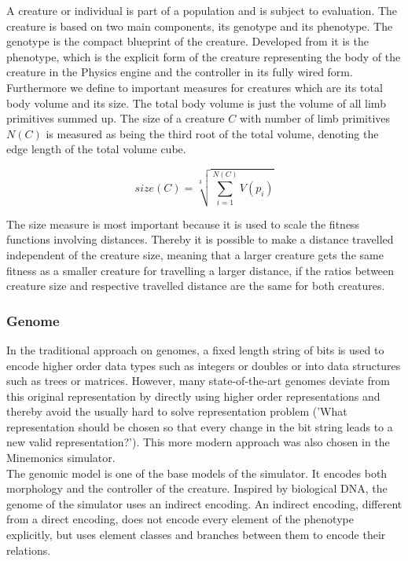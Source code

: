 \documentclass[main]{subfiles}
\begin{document}
A creature or individual is part of a population and is subject to evaluation. The creature is based on two main components, its genotype and its phenotype. The genotype is the compact blueprint of the creature. Developed from it is the phenotype, which is the explicit form of the creature representing the body of the creature in the Physics engine and the controller in its fully wired form. Furthermore we define to important measures for creatures which are its total body volume and its size. The total body volume is just the volume of all limb primitives summed up. The size of a creature \(C\) with number of limb primitives \(N(C)\) is measured as being the third root of the total volume, denoting the edge length of the total volume cube. 

\[size(C) = \sqrt[3]{\sum\limits^{N(C)}_{i=1} V(p_i)}\]

The size measure is most important because it is used to scale the fitness functions involving distances. Thereby it is possible to make a distance travelled independent of the creature size, meaning that a larger creature gets the same fitness as a smaller creature for travelling a larger distance, if the ratios between creature size and respective travelled distance are the same for both creatures.

\subsubsection{Genome}

In the traditional approach on genomes, a fixed length string of bits is used to encode higher order data types such as integers or doubles or into data structures such as trees or matrices. However, many state-of-the-art genomes deviate from this original representation by directly using higher order representations and thereby avoid the usually hard to solve representation problem ('What representation should be chosen so that every change in the bit string leads to a new valid representation?'). This more modern approach was also chosen in the Minemonics simulator.\\

The genomic model is one of the base models of the simulator. It encodes both morphology and the controller of the creature. Inspired by biological DNA, the genome of the simulator uses an indirect encoding. An indirect encoding, different from a direct encoding, does not encode every element of the phenotype explicitly, but uses element classes and branches between them to encode their relations. 
\end{document}
